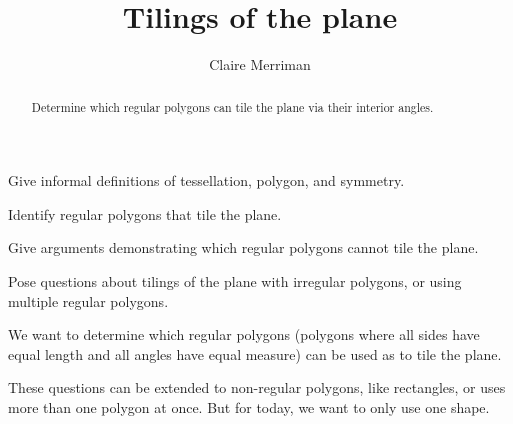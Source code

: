 \documentclass[noauthor,nooutcomes,handout]{ximera}
\title{Tilings of the plane}
\author{Claire Merriman}
\begin{document}
\begin{abstract}
Determine which regular polygons can tile the plane via their interior
angles.
\end{abstract}
\maketitle

\begin{listOutcomes}
\item Give informal definitions of tessellation, polygon, and
  symmetry.
\item Identify regular polygons that tile the plane.
\item Give arguments demonstrating which regular polygons cannot tile
  the plane.
\item Pose questions about tilings of the plane with irregular
  polygons, or using multiple regular polygons.
\end{listOutcomes}


We want to determine which regular polygons (polygons where all sides
have equal length and all angles have equal measure) can be used as to
tile the plane.
 
These questions can be extended to non-regular polygons, like
rectangles, or uses more than one polygon at once. But for today, we
want to only use one shape.
\end{document}
